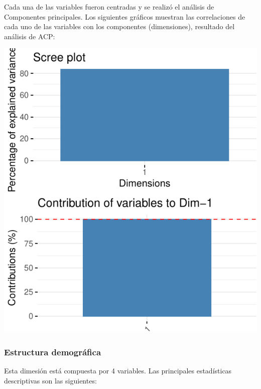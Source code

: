 Cada una de las variables fueron centradas y se realizó el análisis de
Componentes principales. Los siguientes gráficos muestran las
correlaciones de cada uno de las variables con los componentes
(dimensiones), resultado del análisis de ACP:

\includegraphics{Anexo_PCA_files/figure-latex/unnamed-chunk-1-6.pdf}

\hypertarget{estructura-demogruxe1fica}{%
\subsubsection{Estructura demográfica}\label{estructura-demogruxe1fica}}

Esta dimesión está compuesta por 4 variables. Las principales
estadísticas descriptivas son las siguientes:

